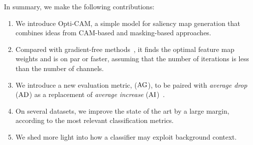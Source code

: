 In summary, we make the following contributions:
\begin{enumerate}[itemsep=2pt, parsep=0pt, topsep=3pt]
	\item We introduce Opti-CAM, a simple model for saliency map generation that combines ideas from CAM-based and masking-based approaches. 
	\item Compared with gradient-free methods~\citep{wang2020score,petsiuk2018rise,ramaswamy2020ablation}, it finds the optimal feature map weights and is on par or faster, assuming that the number of iterations is less than the number of channels.
	\item We introduce a new evaluation metric, \emph{\agf} ($\operatorname{AG}$), to be paired with \emph{average drop} ($\operatorname{AD}$) as a replacement of \emph{average increase} ($\operatorname{AI}$)~\cite{chattopadhay2018grad}.
	\item On several datasets,	we improve the state of the art by a large margin,  according to the most relevant classification metrics.
	\item We shed more light into how a classifier may exploit background context.
\end{enumerate}
